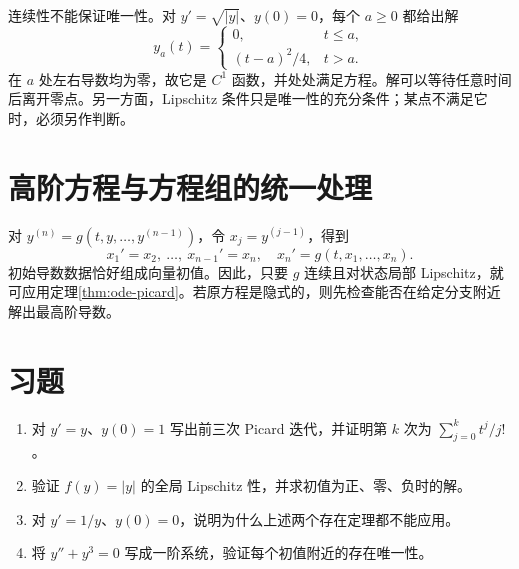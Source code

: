 连续性不能保证唯一性。对 $y'=\sqrt{|y|}$、$y(0)=0$，每个 $a\geq0$ 都给出解
\[
 y_a(t)=\begin{cases}0,&t\leq a,\\(t-a)^2/4,&t>a.\end{cases}
\]
在 $a$ 处左右导数均为零，故它是 $C^1$ 函数，并处处满足方程。解可以等待任意时间后离开零点。另一方面，Lipschitz 条件只是唯一性的充分条件；某点不满足它时，必须另作判断。

\section{高阶方程与方程组的统一处理}
对 $y^{(n)}=g(t,y,\ldots,y^{(n-1)})$，令 $x_j=y^{(j-1)}$，得到
\[
 x_1'=x_2,\ \ldots,\ x_{n-1}'=x_n,\quad x_n'=g(t,x_1,\ldots,x_n).
\]
初始导数数据恰好组成向量初值。因此，只要 $g$ 连续且对状态局部 Lipschitz，就可应用定理\ref{thm:ode-picard}。若原方程是隐式的，则先检查能否在给定分支附近解出最高阶导数。

\section{习题}
\begin{enumerate}
 \item\label{ex:ode-picard} 对 $y'=y$、$y(0)=1$ 写出前三次 Picard 迭代，并证明第 $k$ 次为 $\sum_{j=0}^k t^j/j!$。
 \item 验证 $f(y)=|y|$ 的全局 Lipschitz 性，并求初值为正、零、负时的解。
 \item 对 $y'=1/y$、$y(0)=0$，说明为什么上述两个存在定理都不能应用。
 \item 将 $y''+y^3=0$ 写成一阶系统，验证每个初值附近的存在唯一性。
\end{enumerate}

